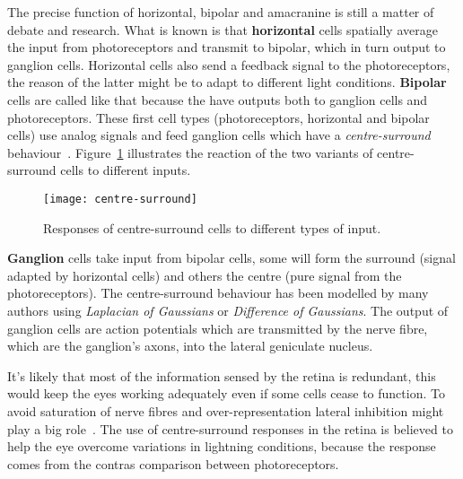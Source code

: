 The precise function of horizontal, bipolar and amacranine is still a matter of debate and research. What is known is that \textbf{horizontal} cells  spatially average the input from photoreceptors and transmit to bipolar, which in turn output to ganglion cells. Horizontal cells also send a feedback signal to the photoreceptors, the reason of the latter might be to adapt to different light conditions. \textbf{Bipolar} cells are called like that because the have outputs both to ganglion cells and photoreceptors. These first cell types (photoreceptors, horizontal and bipolar cells) use analog signals and feed ganglion cells which have a \emph{centre-surround} behaviour~\cite{eye-brain-vision-hubel1995,thompson2000brain}. Figure~\ref{fig:vision:centre-surround} illustrates the reaction of the two variants of centre-surround cells to different inputs.

\begin{figure}[h]
  \begin{center}
    \texttt{[image: centre-surround]}
    \caption{Responses of centre-surround cells to different types of input.}
    \label{fig:vision:centre-surround}
  \end{center}
\end{figure}


\textbf{Ganglion} cells take input from bipolar cells, some will form the surround (signal adapted by horizontal cells) and others the centre (pure signal from the photoreceptors). The centre-surround behaviour has been modelled by many authors using \emph{Laplacian of Gaussians} or \emph{Difference of Gaussians}. The output of ganglion cells are action potentials which are transmitted by the nerve fibre, which are the ganglion's axons, into the lateral geniculate nucleus.

It's likely that most of the information sensed by the retina is redundant, this would keep the eyes working adequately even if some cells cease to function. To avoid saturation of nerve fibres and over-representation lateral inhibition might play a big role~\cite{basab-model,thorpe-rate-coding-theory,field-sensory-coding}. The use of centre-surround responses in the retina is believed to help the eye overcome variations in lightning conditions, because the response comes from the contras comparison between photoreceptors.


